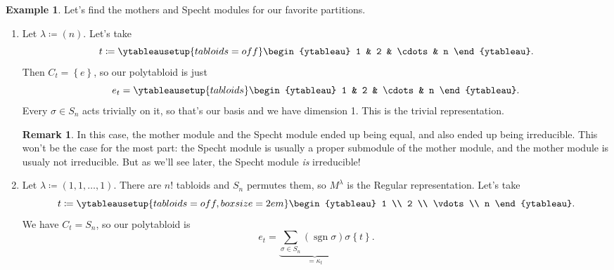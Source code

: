 \documentclass[12pt]{article}
\newcommand{\ita}[1]{\textit{#1}}
\newcommand\paren[1]{\left( #1 \right)}
\newcommand\setb[1]{\left \{ #1 \right \}}
\theoremstyle{definition}
\newtheorem*{remark}{Remark}
\newtheorem{example}{Example}[section]
\DeclareMathOperator\sgn{sgn}
\begin{document}
\begin{example}
    Let's find the mothers and Specht modules for our favorite partitions.
    \begin{enumerate}
        \item Let $\lambda \coloneqq  (n)$. Let's take 
        \begin{equation*}
            t \coloneqq  \ytableausetup{tabloids = off}
            \begin{ytableau}
                1 & 2 & \cdots & n
            \end{ytableau}.
        \end{equation*}
        Then $C_t = \setb{ e }$, so our polytabloid is just 
        \begin{equation*}
            e_t = \ytableausetup{tabloids}
            \begin{ytableau}
                1 & 2 & \cdots & n
            \end{ytableau}.
        \end{equation*}
        Every $\sigma \in S_n$ acts trivially on it, so that's our basis and we have dimension 1. This is the trivial representation.
        \begin{remark}
            In this case, the mother module and the Specht module ended up being equal, and also ended up being irreducible. This won't be the case for the most part: the Specht module is usually a proper submodule of the mother module, and the mother module is usualy not irreducible. But as we'll see later, the Specht module \ita{is} irreducible!
        \end{remark}
        \item Let $\lambda \coloneqq  \paren{ 1 , 1 , \dotsc , 1 }$. There are $n!$ tabloids and $S_n$ permutes them, so $M^{\lambda}$ is the Regular representation. Let's take
        \begin{equation*}
            t \coloneqq  
            \ytableausetup{tabloids = off,boxsize=2em}
            \begin{ytableau}
                1 \\
                2 \\
                \vdots \\
                n
            \end{ytableau}.
        \end{equation*}
        We have $C_t = S_n$, so our polytabloid is 
        \begin{equation*}
            e_t = \underbrace{ \sum\limits_{\sigma \in S_n} \paren{ \sgn \sigma } \sigma }_{ = \kappa_t } \setb{ t }.

\end{equation*}
\end{enumerate}
\end{example}
\end{document}
